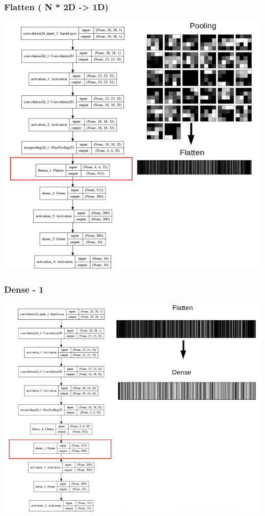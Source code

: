 \documentclass[tikz,10pt]{beamer}
\begin{document}
\begin{frame}
	\frametitle{Flatten ( N * 2D -> 1D)}
	\centering
	\includegraphics[height=.8\paperheight]{images/fabio/flatten_1}
\end{frame}


\begin{frame}
	\frametitle{Dense - 1}
	\centering
	\includegraphics[height=.8\paperheight]{images/fabio/dense1}
\end{frame}
\end{document}

